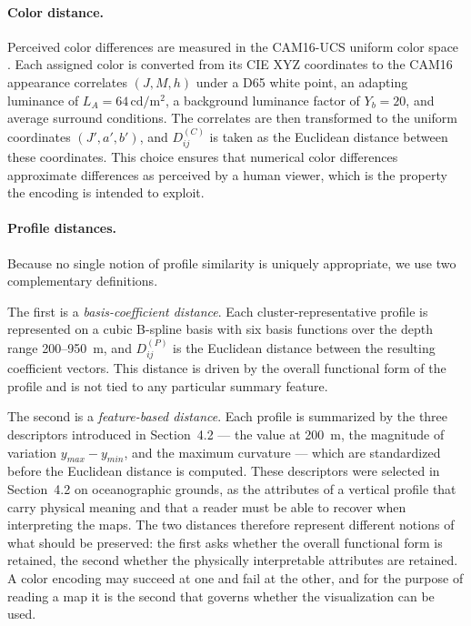 \documentclass[11pt]{article}
\theoremstyle{plain}
\begin{document}
\paragraph{Color distance.}
Perceived color differences are measured in the CAM16-UCS uniform color space \citep{Li2017}.
Each assigned color is converted from its CIE XYZ coordinates to the CAM16
appearance correlates $(J, M, h)$ under a D65 white point, an adapting luminance
of $L_A = 64\,\mathrm{cd/m^2}$, a background luminance factor of $Y_b = 20$, and
average surround conditions. The correlates are then transformed to the uniform
coordinates $(J', a', b')$, and $D^{(C)}_{ij}$ is taken as the Euclidean
distance between these coordinates. This choice ensures that numerical color
differences approximate differences as perceived by a human viewer, which is the
property the encoding is intended to exploit.

\paragraph{Profile distances.}
Because no single notion of profile similarity is uniquely appropriate, we use
two complementary definitions.

The first is a \emph{basis-coefficient distance}. Each cluster-representative
profile is represented on a cubic B-spline basis with six basis functions over
the depth range 200--950~m, and $D^{(P)}_{ij}$ is the Euclidean distance between
the resulting coefficient vectors. This distance is driven by the overall
functional form of the profile and is not tied to any particular summary
feature.

The second is a \emph{feature-based distance}. Each profile is summarized by the
three descriptors introduced in Section~4.2 --- the value at 200~m, the magnitude of variation $y_{max}-y_{min}$, and the maximum curvature --- which are standardized before the Euclidean
distance is computed. These descriptors were selected in Section~4.2 on
oceanographic grounds, as the attributes of a vertical profile that carry
physical meaning and that a reader must be able to recover when interpreting the
maps. The two distances therefore represent different notions of what should be
preserved: the first asks whether the overall functional form is retained, the
second whether the physically interpretable attributes are retained. A color
encoding may succeed at one and fail at the other, and for the purpose of
reading a map it is the second that governs whether the visualization can be
used.
\end{document}
